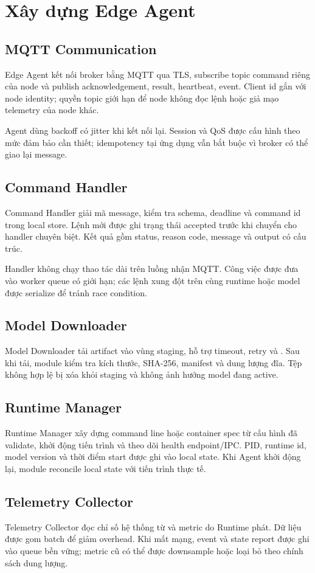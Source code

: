 \section{Xây dựng Edge Agent}

\subsection{MQTT Communication}

Edge Agent kết nối broker bằng MQTT qua TLS, subscribe topic command riêng của
node và publish acknowledgement, result, heartbeat, event. Client id gắn với node
identity; quyền topic giới hạn để node không đọc lệnh hoặc giả mạo telemetry của
node khác.

Agent dùng backoff có jitter khi kết nối lại. Session và QoS được cấu hình theo
mức đảm bảo cần thiết; idempotency tại ứng dụng vẫn bắt buộc vì broker có thể
giao lại message.

\subsection{Command Handler}

Command Handler giải mã message, kiểm tra schema, deadline và command id trong
local store. Lệnh mới được ghi trạng thái accepted trước khi chuyển cho handler
chuyên biệt. Kết quả gồm status, reason code, message và output có cấu trúc.

Handler không chạy thao tác dài trên luồng nhận MQTT. Công việc được đưa vào
worker queue có giới hạn; các lệnh xung đột trên cùng runtime hoặc model được
serialize để tránh race condition.

\subsection{Model Downloader}

Model Downloader tải artifact vào vùng staging, hỗ trợ timeout, retry và
. Sau khi tải, module kiểm tra kích thước, SHA-256,
manifest và dung lượng đĩa. Tệp không hợp lệ bị xóa khỏi staging và không ảnh
hưởng model đang active.

\subsection{Runtime Manager}

Runtime Manager xây dựng command line hoặc container spec từ cấu hình đã
validate, khởi động tiến trình và theo dõi health endpoint/IPC. PID, runtime id,
model version và thời điểm start được ghi vào local state. Khi Agent khởi động
lại, module reconcile local state với tiến trình thực tế.

\subsection{Telemetry Collector}

Telemetry Collector đọc chỉ số hệ thống từ 
và metric do Runtime phát. Dữ liệu được gom batch để giảm overhead. Khi mất mạng,
event và state report được ghi vào queue bền vững; metric cũ có thể được downsample
hoặc loại bỏ theo chính sách dung lượng.